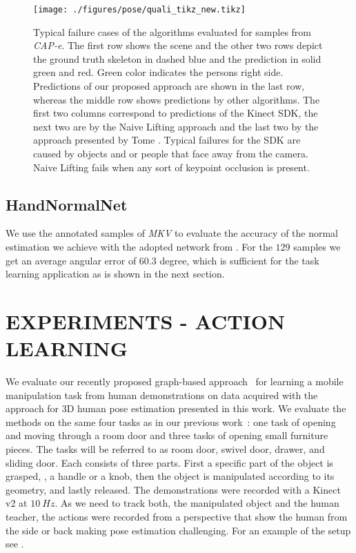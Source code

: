 \begin{figure*}
\centering
    \texttt{[image: ./figures/pose/quali\_tikz\_new.tikz]}
\caption{Typical failure cases of the algorithms evaluated for samples from \textit{CAP-e}. The first row shows the scene and the other two rows depict the ground truth skeleton in dashed blue and the prediction in solid green and red. Green color indicates the persons right side. Predictions of our proposed approach are shown in the last row, whereas the middle row shows predictions by other algorithms. The first two columns correspond to predictions of the Kinect SDK, the next two are by the Naive Lifting approach and the last two by the approach presented by Tome \etal\cite{tome_lifting_2017}. Typical failures for the SDK are caused by objects and or people that face away from the camera. Naive Lifting fails when any sort of keypoint occlusion is present. }
\label{fig:qualitative_results}
\end{figure*}


\subsection{HandNormalNet}
We use the annotated samples of \textit{MKV} to evaluate the accuracy of the normal estimation we achieve with the adopted network from \cite{zb2017hand}. For the $129$ samples we get an average angular error of $60.3$ degree, which is sufficient for the task learning application as is shown in the next section.



\section{EXPERIMENTS - ACTION LEARNING}
\label{exp_action_learning}
We evaluate our recently proposed graph-based approach~\cite{twelsche17iros} for learning a mobile manipulation task from human demonstrations on data acquired with the approach for 3D human pose estimation presented in this work. We evaluate the methods on the same four tasks as in our previous work~\cite{twelsche17iros}: one task of opening and moving through a room door and three tasks of opening small furniture pieces. The tasks will be referred to as room door, swivel door, drawer, and sliding door. Each consists of three parts. First a specific part of the object is grasped, \ie, a handle or a knob, then the object is manipulated according to its geometry, and lastly released. The demonstrations were recorded with a Kinect v2 at $\SI{10}{Hz}$. As we need to track both, the manipulated object and the human teacher, the actions were recorded from a perspective that show the human from the side or back making pose estimation challenging. For an example of the setup see .   

